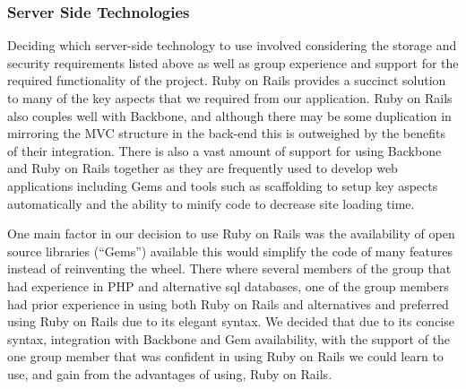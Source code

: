	\subsubsection{Server Side Technologies}
		Deciding which server-side technology to use involved considering the storage and security requirements listed above as well as group experience and support for the required functionality of the project. Ruby on Rails provides a succinct solution to many of the key aspects that we required from our application. Ruby on Rails also couples well with Backbone, and although there may be some duplication in mirroring the MVC structure in the back-end this is outweighed by the benefits of their integration. There is also a vast amount of support for using Backbone and Ruby on Rails together as they are frequently used to develop web applications including Gems and tools such as scaffolding to setup key aspects automatically and the ability to minify code to decrease site loading time.
		
		One main factor in our decision to use Ruby on Rails was the availability of open source libraries (``Gems'') available this would simplify the code of many features instead of reinventing the wheel.
		There where several members of the group that had experience in PHP and alternative sql databases, one of the group members had prior experience in using both Ruby on Rails and alternatives and preferred using Ruby on Rails due to its elegant syntax. We decided that due to its concise syntax, integration with Backbone and Gem availability, with the support of the one group member that was confident in using Ruby on Rails we could learn to use, and gain from the advantages of using, Ruby on Rails.
